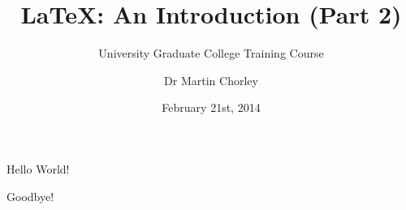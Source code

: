 \documentclass{beamer}
\title{\LaTeX: An Introduction (Part 2)}
\subtitle{University Graduate College Training Course}
\author[Martin Chorley]{Dr Martin Chorley}
\institute[COMSC]{School of Computer Science \& Informatics, Cardiff University}
\date[21/02/13]{February 21st, 2014}
\begin{document}
\begin{frame}
	\titlepage
\end{frame}


\begin{frame}
	\vfill
		Hello World!
	\vfill
\end{frame}

\begin{frame}
	\vfill
		Goodbye!
	\vfill
\end{frame}
\end{document}
